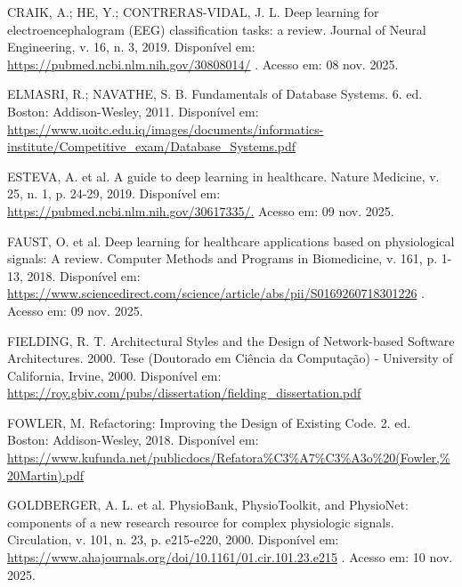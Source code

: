 \begin{SingleSpace}
{\raggedright\setlength{\parindent}{0pt} CRAIK, A.; HE, Y.; CONTRERAS-VIDAL, J. L. Deep learning for electroencephalogram (EEG) classification tasks: a review. Journal of Neural Engineering, v. 16, n. 3, 2019. Disponível em: \url{https://pubmed.ncbi.nlm.nih.gov/30808014/} . Acesso em: 08 nov. 2025.\par}\smallskip

{\raggedright\setlength{\parindent}{0pt} ELMASRI, R.; NAVATHE, S. B. Fundamentals of Database Systems. 6. ed. Boston: Addison-Wesley, 2011. Disponível em: \url{https://www.uoitc.edu.iq/images/documents/informatics-institute/Competitive_exam/Database_Systems.pdf}\par}\smallskip

{\raggedright\setlength{\parindent}{0pt} ESTEVA, A. et al. A guide to deep learning in healthcare. Nature Medicine, v. 25, n. 1, p. 24-29, 2019. Disponível em: \url{https://pubmed.ncbi.nlm.nih.gov/30617335/.} Acesso em: 09 nov. 2025.\par}\smallskip

{\raggedright\setlength{\parindent}{0pt} FAUST, O. et al. Deep learning for healthcare applications based on physiological signals: A review. Computer Methods and Programs in Biomedicine, v. 161, p. 1-13, 2018. Disponível em: \url{https://www.sciencedirect.com/science/article/abs/pii/S0169260718301226} . Acesso em: 09 nov. 2025.\par}\smallskip

{\raggedright\setlength{\parindent}{0pt} FIELDING, R. T. Architectural Styles and the Design of Network-based Software Architectures. 2000. Tese (Doutorado em Ciência da Computação) - University of California, Irvine, 2000. Disponível em: \url{https://roy.gbiv.com/pubs/dissertation/fielding_dissertation.pdf}\par}\smallskip

{\raggedright\setlength{\parindent}{0pt} FOWLER, M. Refactoring: Improving the Design of Existing Code. 2. ed. Boston: Addison-Wesley, 2018. Disponível em: \url{https://www.kufunda.net/publicdocs/Refatora%C3%A7%C3%A3o%20(Fowler,%20Martin).pdf}\par}\smallskip

{\raggedright\setlength{\parindent}{0pt} GOLDBERGER, A. L. et al. PhysioBank, PhysioToolkit, and PhysioNet: components of a new research resource for complex physiologic signals. Circulation, v. 101, n. 23, p. e215-e220, 2000. Disponível em: \url{https://www.ahajournals.org/doi/10.1161/01.cir.101.23.e215} . Acesso em: 10 nov. 2025.\par}\smallskip


\end{SingleSpace}
